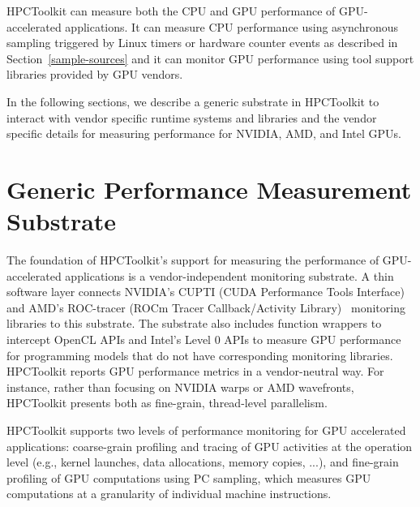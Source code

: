 HPCToolkit can measure both the CPU and GPU performance of GPU-accelerated applications. It can measure CPU performance using asynchronous sampling triggered by Linux timers or hardware counter events as described in 
Section~\ref{sample-sources} and it can monitor GPU performance using tool support libraries provided by GPU vendors.

In the following sections, we describe a generic substrate in HPCToolkit to interact with vendor specific runtime systems and libraries and the vendor specific details for measuring performance for NVIDIA, AMD, and Intel GPUs. 

\section{Generic Performance Measurement Substrate}

The foundation of HPCToolkit's support for measuring the performance of GPU-accelerated applications is a vendor-independent monitoring substrate. A thin software layer connects NVIDIA's CUPTI (CUDA Performance Tools Interface)~\cite{cupti} and AMD's ROC-tracer (ROCm Tracer Callback/Activity Library)~\cite{roctracer} monitoring libraries to this substrate. The substrate also includes function wrappers to intercept OpenCL APIs and Intel's Level 0 APIs to measure GPU performance for programming models that do not have corresponding monitoring libraries. HPCToolkit reports GPU performance metrics in a vendor-neutral way. For instance, rather than focusing on NVIDIA warps or AMD wavefronts, HPCToolkit presents both as fine-grain, thread-level parallelism.

HPCToolkit supports two levels of performance monitoring for GPU accelerated applications: coarse-grain profiling and tracing of GPU activities at the operation level (e.g., kernel launches, data allocations, memory copies, ...), and fine-grain profiling of GPU computations using PC sampling, which measures GPU computations at a granularity of individual machine instructions.

